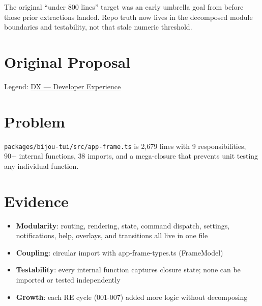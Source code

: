 The original ``under 800 lines'' target was an early umbrella goal from before those prior extractions landed. Repo truth now lives in the decomposed module boundaries and testability, not that stale numeric threshold.

\section{Original Proposal}\label{record-307-original-proposal}

Legend: \href{https://github.com/flyingrobots/bijou/blob/1853ad902f6bf219326409e7f743a5a1d6517dbc/docs/legends/DX-developer-experience.md}{DX --- Developer Experience}

\section{Problem}\label{record-307-problem}

\texttt{p\allowbreak{}a\allowbreak{}c\allowbreak{}k\allowbreak{}a\allowbreak{}g\allowbreak{}e\allowbreak{}s\allowbreak{}/\allowbreak{}b\allowbreak{}i\allowbreak{}j\allowbreak{}o\allowbreak{}u\allowbreak{}-\allowbreak{}t\allowbreak{}u\allowbreak{}i\allowbreak{}/\allowbreak{}s\allowbreak{}r\allowbreak{}c\allowbreak{}/\allowbreak{}a\allowbreak{}p\allowbreak{}p\allowbreak{}-\allowbreak{}f\allowbreak{}r\allowbreak{}a\allowbreak{}m\allowbreak{}e\allowbreak{}.\allowbreak{}t\allowbreak{}s} is 2,679 lines with 9 responsibilities, 90+ internal functions, 38 imports, and a mega-closure that prevents unit testing any individual function.

\section{Evidence}\label{record-307-evidence}

\begin{itemize}
\tightlist
\item
  \textbf{Modularity}: routing, rendering, state, command dispatch, settings, notifications, help, overlays, and transitions all live in one file
\item
  \textbf{Coupling}: circular import with app-frame-types.ts (FrameModel)
\item
  \textbf{Testability}: every internal function captures closure state; none can be imported or tested independently
\item
  \textbf{Growth}: each RE cycle (001-007) added more logic without decomposing
\end{itemize}

